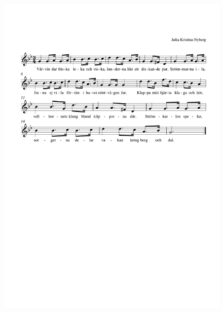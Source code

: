 \documentclass[a6paper,11pt]{article}
\begin{document}
\setlength{\oddsidemargin}{-0.47in}
\begin{center}
\end{center}
\vspace{-40pt}
\begin{figure}[!h]
\centering
\includegraphics[width=\textwidth]{molltoner}
\end{figure}
\end{document}
